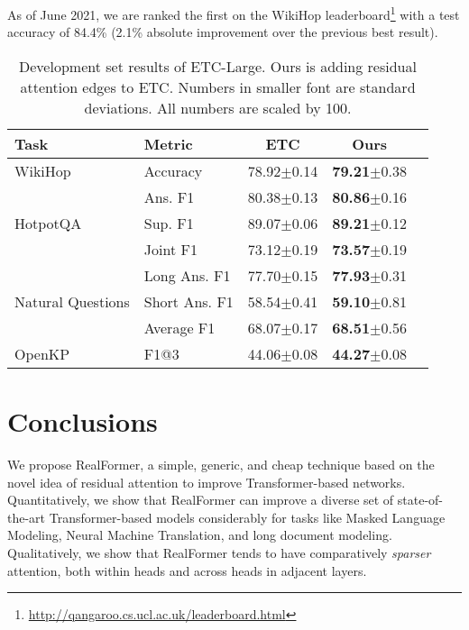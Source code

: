 \documentclass[11pt,a4paper]{article}
\begin{document}
As of June 2021, we are ranked the first on the WikiHop leaderboard\footnote{\url{http://qangaroo.cs.ucl.ac.uk/leaderboard.html}}
with a test accuracy of 84.4\% (2.1\% absolute improvement over the previous best result).


\begin{table}
\setlength{\tabcolsep}{3.5pt}
\centering
\begin{tabular}{l|l||ccc} \hline
\textbf{Task}              & \textbf{Metric}    & \textbf{ETC}           &\textbf{Ours} \\ \hline
WikiHop                    & Accuracy           &78.92\tiny{$\pm$0.14}   &\textbf{79.21}\tiny{$\pm$0.38}   \\ \hline

\multirow{3}{*}{HotpotQA}  & Ans. F1            &80.38\tiny{$\pm$0.13}  &\textbf{80.86}\tiny{$\pm$0.16}   \\
                           & Sup. F1            &89.07\tiny{$\pm$0.06}  &\textbf{89.21}\tiny{$\pm$0.12}   \\
                           & Joint F1           &73.12\tiny{$\pm$0.19}  &\textbf{73.57}\tiny{$\pm$0.19}   \\ \hline

\multirow{3}{1.5cm}{Natural Questions}        & Long Ans. F1       &77.70\tiny{$\pm$0.15}   &\textbf{77.93}\tiny{$\pm$0.31}   \\
                           & Short Ans. F1      &58.54\tiny{$\pm$0.41}   &\textbf{59.10}\tiny{$\pm$0.81}   \\
                           & Average F1         &68.07\tiny{$\pm$0.17}   &\textbf{68.51}\tiny{$\pm$0.56}   \\ \hline

OpenKP                     & F1@3               &44.06\tiny{$\pm$0.08}   &\textbf{44.27}\tiny{$\pm$0.08}   \\ \hline
\end{tabular}
\caption{Development set results of ETC-Large. Ours is adding residual attention edges to ETC. Numbers in smaller font are standard deviations. All numbers are scaled by 100.}
\label{table:etc}
\end{table}






\section{Conclusions}
We propose RealFormer, a simple, generic, and cheap technique based on the novel idea of residual attention to improve Transformer-based networks.
Quantitatively, we show that RealFormer can improve a diverse set of state-of-the-art Transformer-based models considerably for tasks like Masked Language Modeling, Neural Machine Translation, and long document modeling.
Qualitatively, we show that RealFormer tends to have comparatively \emph{sparser} attention, both within heads and across heads in adjacent layers.
\end{document}
